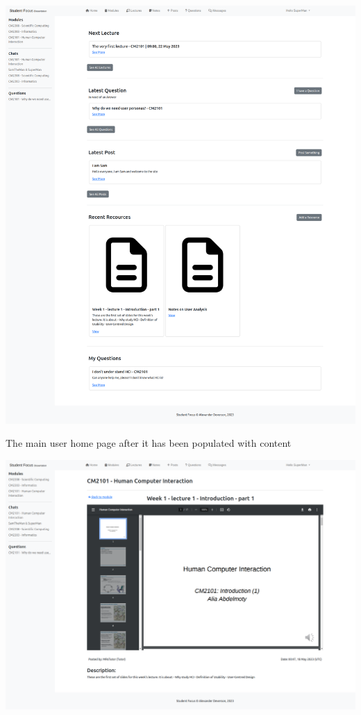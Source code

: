 \includegraphics[scale=0.20]{images/application/34 - home_page_populated.png}

The main user home page after it has been populated with content

\includegraphics[scale=0.20]{images/application/35 - resource_single_view.png}

